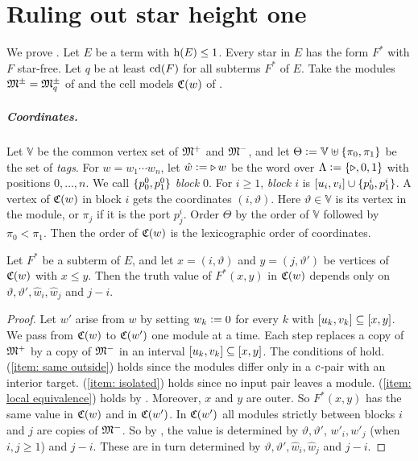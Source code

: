 \section{Ruling out star height one}\label{section: lower bound}

We prove .
Let $E$ be a term with $\mathrm{h}(E) \le 1$.
Every star in $E$ has the form $F^{*}$ with $F$ star-free.
Let $q$ be at least $\mathrm{cd}(F)$ for all subterms $F^{*}$ of $E$.
Take the modules $\mathfrak{M}^{\pm} = \mathfrak{M}^{\pm}_q$ of  and the cell models $\mathfrak{C}(w)$ of .

\subparagraph*{Coordinates.}
Let $\mathbb{V}$ be the common vertex set of $\mathfrak{M}^{+}$ and $\mathfrak{M}^{-}$, and let $\Theta \mathrel{\vcentcolon=} \mathbb{V} \uplus \{\pi_0, \pi_1\}$ be the set of \emph{tags}.
For $w = w_1 \cdots w_n$, let $\hat w \mathrel{\vcentcolon=} {\triangleright}\, w$ be the word over $\Lambda \mathrel{\vcentcolon=} \{{\triangleright}, 0, 1\}$ with positions $0, \dots, n$.
We call $\{p^{0}_0, p^{0}_1\}$ \emph{block $0$}.
For $i \ge 1$, \emph{block $i$} is $[u_i, v_i] \cup \{p^{i}_0, p^{i}_1\}$.
A vertex of $\mathfrak{C}(w)$ in block $i$ gets the coordinates $(i, \vartheta)$.
Here $\vartheta \in \mathbb{V}$ is its vertex in the module, or $\pi_j$ if it is the port $p^{i}_j$.
Order $\Theta$ by the order of $\mathbb{V}$ followed by $\pi_0 < \pi_1$.
Then the order of $\mathfrak{C}(w)$ is the lexicographic order of coordinates.

\begin{lemma}[Normalization]\label{lemma: normalization}
  Let $F^{*}$ be a subterm of $E$, and let $x = (i, \vartheta)$ and $y = (j, \vartheta')$ be vertices of $\mathfrak{C}(w)$ with $x \le y$.
  Then the truth value of $F^{*}(x, y)$ in $\mathfrak{C}(w)$ depends only on $\vartheta, \vartheta', \hat w_i, \hat w_j$ and $j - i$.
\end{lemma}
\begin{proof}
  Let $w'$ arise from $w$ by setting $w_k \mathrel{\vcentcolon=} 0$ for every $k$ with $[u_k, v_k] \subseteq [x, y]$.
  We pass from $\mathfrak{C}(w)$ to $\mathfrak{C}(w')$ one module at a time.
  Each step replaces a copy of $\mathfrak{M}^{+}$ by a copy of $\mathfrak{M}^{-}$ in an interval $[u_k, v_k] \subseteq [x, y]$.
  The conditions of  hold.
  (\ref{item: same outside}) holds since the modules differ only in a $c$-pair with an interior target.
  (\ref{item: isolated}) holds since no input pair leaves a module.
  (\ref{item: local equivalence}) holds by .
  Moreover, $x$ and $y$ are outer.
  So $F^{*}(x, y)$ has the same value in $\mathfrak{C}(w)$ and in $\mathfrak{C}(w')$.
  In $\mathfrak{C}(w')$ all modules strictly between blocks $i$ and $j$ are copies of $\mathfrak{M}^{-}$.
  So by , the value is determined by $\vartheta, \vartheta'$, $w'_i, w'_j$ (when $i, j \ge 1$) and $j - i$.
  These are in turn determined by $\vartheta, \vartheta', \hat w_i, \hat w_j$ and $j - i$.
\end{proof}

